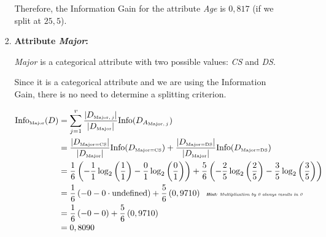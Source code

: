 \documentclass[
english,
smallborders
]{i6prcsht}
\newcommand{\OfSpecificValue}[3]{_{\text{\tiny #1#2#3}}}
\newcommand{\OfAttribute}[1]{_{\text{\tiny #1}}}
\begin{document}
\begin{solution}
\begin{enumerate}
\begin{enumerate}
\begin{enumerate}
\begin{enumerate}
				                  \end{enumerate}

				                  Therefore, the Information Gain for the attribute \textit{Age} is $0,817$ (if we split at $25,5$).

				            \item \textbf{Attribute \textit{Major}:}

				                  \textit{Major} is a categorical attribute with two possible values: \textit{CS} and \textit{DS}.

				                  Since it is a categorical attribute and we are using the Information Gain, there is no need to determine a splitting criterion.

				                  \begin{alignat*}{2}
					                  \text{Info}\OfAttribute{Major}(D) & = \sum_{j=1}^v \frac{|D\OfAttribute{Major$,j$}|}{|D\OfAttribute{Major}|} \text{Info}(D_{A\OfAttribute{Major$,j$}})                                                                                                                      \\
					                                                    & = \frac{|D\OfSpecificValue{Major}{=}{CS}|}{|D\OfAttribute{Major}|} \text{Info}(D\OfSpecificValue{Major}{=}{CS}) + \frac{|D\OfSpecificValue{Major}{=}{DS}|}{|D\OfAttribute{Major}|} \text{Info}(D\OfSpecificValue{Major}{=}{DS})         \\
					                                                    & = \frac{1}{6} \left(-\frac{1}{1} \log_2\left(\frac{1}{1}\right) - \frac{0}{1} \log_2\left(\frac{0}{1}\right)\right) + \frac{5}{6} \left(-\frac{2}{5} \log_2\left(\frac{2}{5}\right) - \frac{3}{5} \log_2\left(\frac{3}{5}\right)\right) \\
					                                                    & = \frac{1}{6} \left(- 0 - 0 \cdot \text{undefined}\right) + \frac{5}{6} \left(0,9710\right) \text{\tiny \textit{\hspace{0,2cm}\textbf{Hint:} Multiplication by 0 always results in 0}}                                                  \\
					                                                    & = \frac{1}{6} \left(- 0 - 0 \right) + \frac{5}{6} \left(0,9710\right)                                                                                                                                                                   \\
					                                                    & = 0,8090                                                                                                                                                                                                                                \\

\end{alignat*}
\end{enumerate}
\end{enumerate}
\end{enumerate}
\end{solution}
\end{document}
